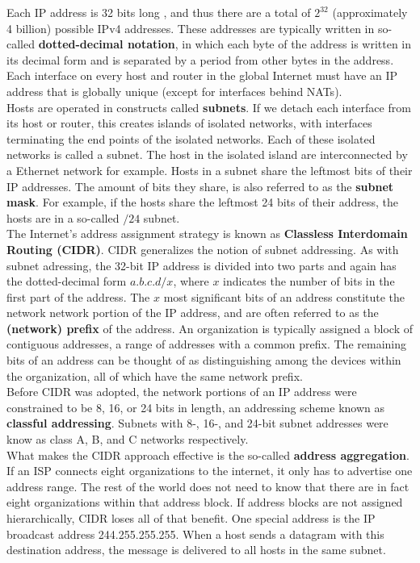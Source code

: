 Each IP address is 32 bits long , and thus there are a total of $2^{32}$ (approximately 4 billion) possible IPv4 addresses. These addresses are typically written in so-called \textbf{dotted-decimal notation}, in which each byte of the address is written in its decimal form and is separated by a period from other bytes in the address. Each interface on every host and router in the global Internet must have an IP address that is globally unique (except for interfaces behind NATs). \\
Hosts are operated in constructs called \textbf{subnets}. If we detach each interface from its host or router, this creates islands of isolated networks, with interfaces terminating the end points of the isolated networks. Each of these isolated networks is called a subnet. The host in the isolated island are interconnected by a Ethernet network for example. Hosts in a subnet share the leftmost bits of their IP addresses. The amount of bits they share, is also referred to as the \textbf{subnet mask}. For example, if the hosts share the leftmost 24 bits of their address, the hosts are in a so-called $/24$ subnet.\vspace{.3cm}\\

The Internet's address assignment strategy is known as \textbf{Classless Interdomain Routing (CIDR)}. CIDR generalizes the notion of subnet addressing. As with subnet adressing, the 32-bit IP address is divided into two parts and again has the dotted-decimal form $a.b.c.d/x$, where $x$ indicates the number of bits in the first part of the address. The $x$ most significant bits of an address constitute the network network portion of the IP address, and are often referred to as the \textbf{(network) prefix} of the address. An organization is typically assigned a block of contiguous addresses, a range of addresses with a common prefix. The remaining bits of an address can be thought of as distinguishing among the devices within the organization, all of which have the same network prefix.\\
Before CIDR was adopted, the network portions of an IP address were constrained to be 8, 16, or 24 bits in length, an addressing scheme known as \textbf{classful addressing}. Subnets with 8-, 16-, and 24-bit subnet addresses were know as class A, B, and C networks respectively. \\
What makes the CIDR approach effective is the so-called \textbf{address aggregation}. If an ISP connects eight organizations to the internet, it only has to advertise one address range. The rest of the world does not need to know that there are in fact eight organizations within that address block. If address blocks are not assigned hierarchically, CIDR loses all of that benefit. One special address is the IP broadcast address 244.255.255.255. When a host sends a datagram with this destination address, the message is delivered to all hosts in the same subnet.\vspace{.3cm}\\

